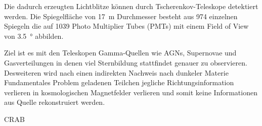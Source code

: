 Die dadurch erzeugten Lichtblitze können durch Tscherenkov-Teleskope detektiert
werden.
Die Spiegelfläche von \SI{17}{\meter} Durchmesser besteht aus \num{974} einzelnen
Spiegeln die auf \num{1039} Photo Multiplier Tubes (PMTs) mit einem
Field of View von \SI{3.5}{\degree} abbilden.

Ziel ist es mit den Teleskopen Gamma-Quellen wie AGNs, Supernovae und
Gasverteilungen in denen viel Sternbildung stattfindet genauer zu observieren.
Desweiteren wird nach einen indirekten Nachweis nach dunkeler Materie
Fundamentales Problem geladenen Teilchen jegliche Richtungsinformation verlieren
in kosmologischen Magnetfelder verlieren und somit keine Informationen aus
Quelle rekonstruiert werden.

{\color{red} CRAB}

\clearpage
